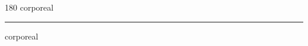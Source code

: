 
\begin{frame}
\begin{center}
\begin{turn}{180}
{\fontsize{2.5cm}{1em}\selectfont corporeal}
\end{turn}
\vspace{1em}\par  
\hrule
\vspace{1em}\par  
{\fontsize{2.5cm}{1em}\selectfont corporeal}
\end{center}
\end{frame}
